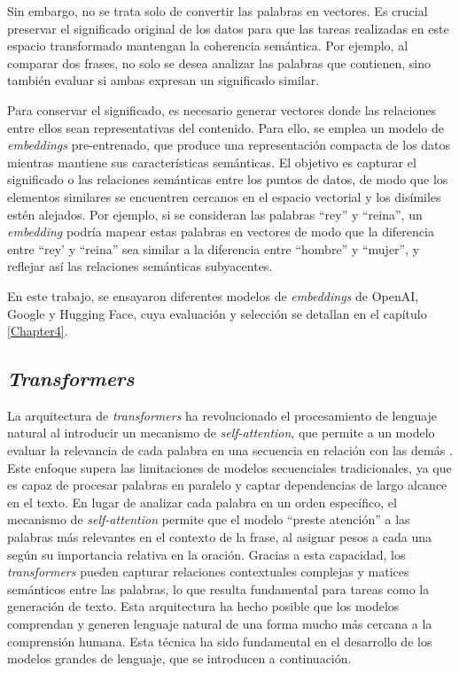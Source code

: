 Sin embargo, no se trata solo de convertir las palabras en vectores. Es crucial preservar el significado original 
de los datos para que las tareas realizadas en este espacio transformado mantengan la coherencia semántica. 
Por ejemplo, al comparar dos frases, no solo se desea analizar las palabras que contienen, sino también evaluar 
si ambas expresan un significado similar.

Para conservar el significado, es necesario generar vectores donde las relaciones entre ellos sean representativas 
del contenido. Para ello, se emplea un modelo de \textit{embeddings} pre-entrenado, que produce una representación compacta 
de los datos mientras mantiene sus características semánticas. El objetivo es capturar el significado o las relaciones 
semánticas entre los puntos de datos, de modo que los elementos similares se encuentren cercanos en el espacio vectorial y los disímiles estén alejados. 
Por ejemplo, si se consideran las palabras ``rey'' y ``reina'', un \textit{embedding} podría mapear estas palabras en vectores de modo 
que la diferencia entre ``rey' y ``reina'' sea similar a la diferencia entre ``hombre'' y ``mujer'', y reflejar así las 
relaciones semánticas subyacentes.

En este trabajo, se ensayaron diferentes modelos de \textit{embeddings} de OpenAI, Google y Hugging Face, 
cuya evaluación y selección se detallan en el capítulo \ref{Chapter4}.

\subsection{\textit{Transformers}}

La arquitectura de \textit{transformers} ha revolucionado el procesamiento de lenguaje natural al introducir un mecanismo de \textit{self-attention}, 
que permite a un modelo evaluar la relevancia de cada palabra en una secuencia en relación con las demás \citep{paper:transformers}. Este enfoque 
supera las limitaciones de modelos secuenciales tradicionales, ya que es capaz de procesar palabras en paralelo y captar dependencias de largo alcance 
en el texto. En lugar de analizar cada palabra en un orden específico, el mecanismo de \textit{self-attention} permite que el modelo ``preste atención'' 
a las palabras más relevantes en el contexto de la frase, al asignar pesos a cada una según su importancia relativa en la oración. Gracias a esta capacidad, 
los \textit{transformers} pueden capturar relaciones contextuales complejas y matices semánticos entre las palabras, 
lo que resulta fundamental para tareas como la generación de texto. Esta arquitectura ha hecho posible que los modelos comprendan y generen 
lenguaje natural de una forma mucho más cercana a la comprensión humana. Esta técnica 
ha sido fundamental en el desarrollo de los modelos grandes de lenguaje, que se introducen a continuación.

